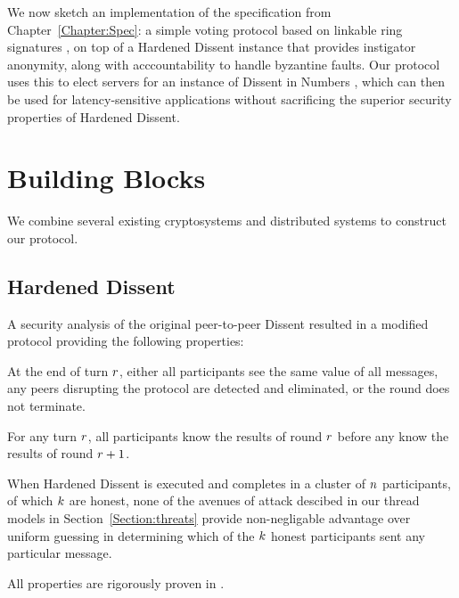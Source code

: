 We now sketch an implementation of the specification from
Chapter~\ref{Chapter:Spec}: a simple voting protocol based on linkable ring
signatures \cite{lrs}, on top of a Hardened Dissent \cite{sec} instance that
provides instigator anonymity, along with acccountability to handle byzantine
faults. Our protocol uses this to elect servers for an instance of Dissent in
Numbers \cite{din}, which can then be used for latency-sensitive applications
without sacrificing the superior security properties of Hardened Dissent.
\section{Building Blocks}
We combine several existing cryptosystems and distributed systems to construct
our protocol.
\subsection{Hardened Dissent}
A security analysis of the original peer-to-peer Dissent resulted in a modified
protocol providing the following properties:
  \begin{theorem} At the end of turn $r$, either all participants see the
    same value of all messages, any peers disrupting the protocol are detected
    and eliminated, or the round does not terminate.%
  \end{theorem}
  \begin{theorem} For any turn $r$, all participants know the results of
    round $r$ before any know the results of round
    $r+1$.\end{theorem}\label{theorem:rounds}
  \begin{theorem}[Anonymity] When Hardened Dissent is executed and completes in
    a cluster of $n$ participants, of which $k$ are honest,
    none of the avenues of attack descibed in our thread models in
    Section~\ref{Section:threats} provide non-negligable advantage over uniform
    guessing in determining which of the $k$ honest participants sent
    any particular message.
  \end{theorem}\label{theorem:anon}
  All properties are rigorously proven in \cite{sec}.


